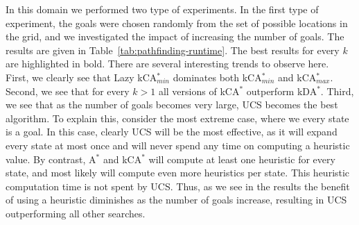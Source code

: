 \documentclass{aicom2e}
\newcommand{\astar}{A$^*$}
\newcommand{\kastar}{kCA$^*$}
\newcommand{\kastarmin}{kCA$^*_{min}$}
\newcommand{\kastarmax}{kCA$^*_{max}$}
\newcommand{\kxastar}{kDA$^*$}
\begin{document}
In this domain we performed two type of experiments. In the first type of
experiment, the goals were chosen randomly from the set of possible locations
in the grid, and we investigated the impact of increasing the number of goals.
The results are given in Table~\ref{tab:pathfinding-runtime}. The best results
for every $k$ are highlighted in bold. There are several interesting trends to
observe here. First, we clearly see that Lazy \kastarmin{} dominates both
\kastarmin{} and \kastarmax{}. Second, we see that for every $k>1$ all versions
of \kastar{}  outperform  \kxastar. Third, we see that as the number of goals
becomes very large, UCS becomes the best algorithm. To explain this, consider
the most extreme case, where we every state is a goal. In this case, clearly
UCS will be the most effective, as it will expand every state at most once and
will never spend any time on computing a heuristic value. By contrast, \astar{}
and \kastar{}  will compute at least one heuristic for every state, and most
likely will compute even more heuristics per state. This heuristic computation
time is not spent by UCS. Thus, as we see in the results the benefit of using a
heuristic diminishes as the number of goals increase, resulting in UCS
outperforming all other searches.



\end{document}
